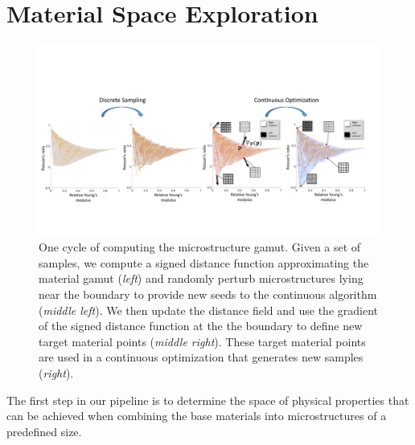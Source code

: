 \section{Material Space Exploration}
\label{sec:sampling}
\begin{figure}
	\centering
	\includegraphics[width=.95\linewidth]{figs/topsampling.pdf}
	\caption{One cycle of computing the microstructure gamut. 
		Given a set of samples, we compute a signed distance function approximating the material gamut (\emph{left}) and randomly perturb microstructures lying near the boundary to provide new seeds to the continuous algorithm (\emph{middle left}). We then update the distance field and use the gradient of the signed distance function at the the boundary to define new target material points (\emph{middle right}). These target material points are used in a continuous optimization that generates new samples (\emph{right}).} 
	\label{fig:lssampling}
\end{figure}

The first step in our pipeline is to determine the space of physical properties that can be achieved when combining the base materials into microstructures of a predefined size.

